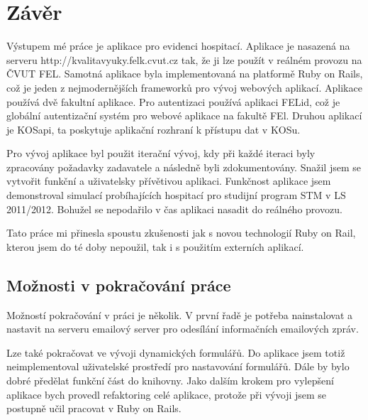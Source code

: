 \chapter{Závěr}

Výstupem mé práce je aplikace pro evidenci hospitací. Aplikace je nasazená na serveru
http://kvalitavyuky.felk.cvut.cz tak, že ji lze použít v reálném provozu na ČVUT FEL. Samotná aplikace byla implementovaná na platformě Ruby on Rails, což je jeden z nejmodernějších frameworků pro vývoj webových aplikací. Aplikace používá dvě fakultní aplikace. Pro autentizaci používá aplikaci FELid, což je globální autentizační systém pro webové aplikace na fakultě FEl. Druhou aplikací je KOSapi, ta poskytuje aplikační rozhraní k přístupu dat v KOSu.

Pro vývoj aplikace byl použit iterační vývoj, kdy při každé iteraci byly zpracovány požadavky zadavatele a následně byli zdokumentovány. Snažil jsem se vytvořit funkční a uživatelsky přívětivou aplikaci. Funkčnost aplikace jsem demonstroval simulací probíhajících hospitací pro studijní program STM v LS 2011/2012. Bohužel se nepodařilo v čas aplikaci nasadit do reálného provozu.

Tato práce mi přinesla spoustu zkušenosti jak s novou technologií Ruby on Rail, kterou jsem do té doby nepoužil, tak i s použitím externích aplikací.

\section{Možnosti v pokračování práce}
Možností pokračování v práci je několik. V první řadě je potřeba nainstalovat a nastavit na serveru emailový server pro odesílání informačních emailových zpráv.

Lze také pokračovat ve vývoji dynamických formulářů. Do aplikace jsem totiž neimplementoval uživatelské prostředí pro nastavování formulářů. Dále by bylo dobré předělat funkční část do knihovny. Jako dalším krokem pro vylepšení aplikace bych provedl refaktoring celé aplikace, protože při vývoji jsem se postupně učil pracovat v Ruby on Rails.
